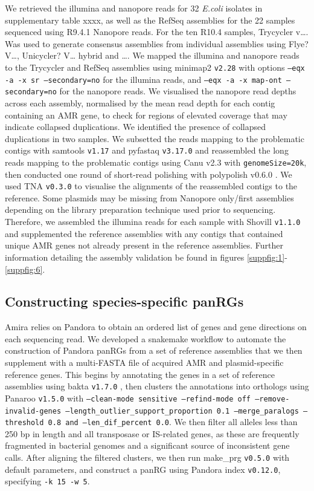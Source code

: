 We retrieved the illumina and nanopore reads for 32 \textit{E.coli} isolates in supplementary table xxxx, as well as the RefSeq assemblies for the 22 samples sequenced using R9.4.1 Nanopore reads. For the ten R10.4 samples, Trycycler v…. Was used to generate consensus assemblies from individual assemblies using Flye? V…, Unicycler? V… hybrid and …. We mapped the illumina and nanopore reads to the Trycycler and RefSeq assemblies using minimap2 \texttt{v2.28} \cite{10.1093/bioinformatics/bty191} with options \texttt{--eqx -a -x sr --secondary=no} for the illumina reads, and \texttt{--eqx -a -x map-ont --secondary=no} for the nanopore reads. We visualised the nanopore read depths across each assembly, normalised by the mean read depth for each contig containing an AMR gene, to check for regions of elevated coverage that may indicate collapsed duplications. We identified the presence of collapsed duplications in two samples. We subsetted the reads mapping to the problematic contigs with samtools \texttt{v1.17} \cite{Li2009} and pyfastaq \texttt{v3.17.0} and reassembled the long reads mapping to the problematic contigs using Canu v2.3 \cite{Koren2017} with \texttt{genomeSize=20k}, then conducted one round of short-read polishing with polypolish v0.6.0 \cite{10.1099/mgen.0.001254}. We used TNA \texttt{v0.3.0} \cite{TNA} to visualise the alignments of the reassembled contigs to the reference. Some plasmids may be missing from Nanopore only/first assemblies depending on the library preparation technique used prior to sequencing. Therefore, we assembled the illumina reads for each sample with Shovill \texttt{v1.1.0} and supplemented the reference assemblies with any contigs that contained unique AMR genes not already present in the reference assemblies. Further information detailing the assembly validation be found in figures \ref{suppfig:1}-\ref{suppfig:6}.

\subsection*{Constructing species-specific panRGs}

Amira relies on Pandora \cite{pandora} to obtain an ordered list of genes and gene directions on each sequencing read. We developed a snakemake \cite{10.1093/bioinformatics/bts480} workflow to automate the construction of Pandora panRGs from a set of reference assemblies that we then supplement with a multi-FASTA file of acquired AMR and plasmid-specific reference genes. This begins by annotating the genes in a set of reference assemblies using bakta \texttt{v1.7.0} \cite{Schwengers2021}, then clusters the annotations into orthologs using Panaroo \texttt{v1.5.0} \cite{panaroo}  with \texttt{--clean-mode sensitive --refind-mode off --remove-invalid-genes --length\_outlier\_support\_proportion 0.1 --merge\_paralogs --threshold 0.8 and --len\_dif\_percent 0.0}. We then filter all alleles less than 250 bp in length and all transposase or IS-related genes, as these are frequently fragmented in bacterial genomes and a significant source of inconsistent gene calls. After aligning the filtered clusters, we then run make\_prg \texttt{v0.5.0} with default parameters, and construct a panRG using Pandora \cite{pandora} index \texttt{v0.12.0}, specifying \texttt{-k 15 -w 5}. 

